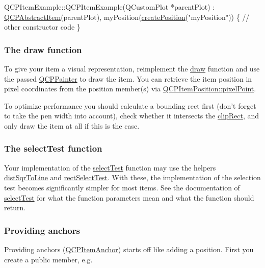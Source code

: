 \begin{DoxyCode}
QCPItemExample::QCPItemExample(QCustomPlot *parentPlot) :
  \hyperlink{class_q_c_p_abstract_item}{QCPAbstractItem}(parentPlot),
  myPosition(\hyperlink{class_q_c_p_abstract_item_a75036d39c4d4e2e1a7dd145fff915d32}{createPosition}(\textcolor{stringliteral}{"myPosition"}))
\{
  \textcolor{comment}{// other constructor code}
\}
\end{DoxyCode}
\hypertarget{class_q_c_p_abstract_item_items-drawing}{}\subsubsection{The draw function}\label{class_q_c_p_abstract_item_items-drawing}
To give your item a visual representation, reimplement the \hyperlink{class_q_c_p_abstract_item_ad0dc056f650c3ca73414e6b4f01674ef}{draw} function and use the passed \hyperlink{class_q_c_p_painter}{Q\-C\-P\-Painter} to draw the item. You can retrieve the item position in pixel coordinates from the position member(s) via \hyperlink{class_q_c_p_item_position_ae490f9c76ee2ba33752c495d3b6e8fb5}{Q\-C\-P\-Item\-Position\-::pixel\-Point}.

To optimize performance you should calculate a bounding rect first (don't forget to take the pen width into account), check whether it intersects the \hyperlink{class_q_c_p_abstract_item_a538e25ff8856534582f5b2b400a46405}{clip\-Rect}, and only draw the item at all if this is the case.\hypertarget{class_q_c_p_abstract_item_items-selection}{}\subsubsection{The select\-Test function}\label{class_q_c_p_abstract_item_items-selection}
Your implementation of the \hyperlink{class_q_c_p_abstract_item_a96d522d10ffc0413b9a366c6f7f0476b}{select\-Test} function may use the helpers \hyperlink{class_q_c_p_abstract_item_acdca343717d625b8abb3c3e38c0ed39d}{dist\-Sqr\-To\-Line} and \hyperlink{class_q_c_p_abstract_item_a4c0e14c4e92df91174cb7183fb363069}{rect\-Select\-Test}. With these, the implementation of the selection test becomes significantly simpler for most items. See the documentation of \hyperlink{class_q_c_p_abstract_item_a96d522d10ffc0413b9a366c6f7f0476b}{select\-Test} for what the function parameters mean and what the function should return.\hypertarget{class_q_c_p_abstract_item_anchors}{}\subsubsection{Providing anchors}\label{class_q_c_p_abstract_item_anchors}
Providing anchors (\hyperlink{class_q_c_p_item_anchor}{Q\-C\-P\-Item\-Anchor}) starts off like adding a position. First you create a public member, e.\-g.


